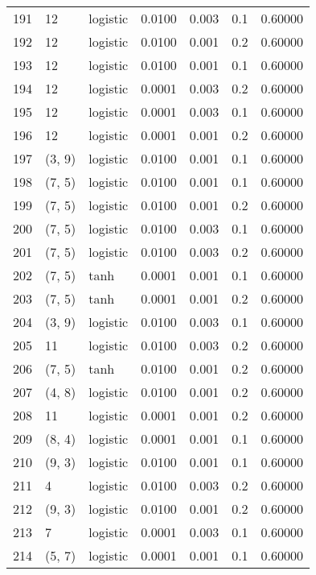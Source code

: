 \begin{tabular}{lllrrrr}
191 &          12 &  logistic &  0.0100 &  0.003 &  0.1 &   0.60000 \\
192 &          12 &  logistic &  0.0100 &  0.001 &  0.2 &   0.60000 \\
193 &          12 &  logistic &  0.0100 &  0.001 &  0.1 &   0.60000 \\
194 &          12 &  logistic &  0.0001 &  0.003 &  0.2 &   0.60000 \\
195 &          12 &  logistic &  0.0001 &  0.003 &  0.1 &   0.60000 \\
196 &          12 &  logistic &  0.0001 &  0.001 &  0.2 &   0.60000 \\
197 &      (3, 9) &  logistic &  0.0100 &  0.001 &  0.1 &   0.60000 \\
198 &      (7, 5) &  logistic &  0.0100 &  0.001 &  0.1 &   0.60000 \\
199 &      (7, 5) &  logistic &  0.0100 &  0.001 &  0.2 &   0.60000 \\
200 &      (7, 5) &  logistic &  0.0100 &  0.003 &  0.1 &   0.60000 \\
201 &      (7, 5) &  logistic &  0.0100 &  0.003 &  0.2 &   0.60000 \\
202 &      (7, 5) &      tanh &  0.0001 &  0.001 &  0.1 &   0.60000 \\
203 &      (7, 5) &      tanh &  0.0001 &  0.001 &  0.2 &   0.60000 \\
204 &      (3, 9) &  logistic &  0.0100 &  0.003 &  0.1 &   0.60000 \\
205 &          11 &  logistic &  0.0100 &  0.003 &  0.2 &   0.60000 \\
206 &      (7, 5) &      tanh &  0.0100 &  0.001 &  0.2 &   0.60000 \\
207 &      (4, 8) &  logistic &  0.0100 &  0.001 &  0.2 &   0.60000 \\
208 &          11 &  logistic &  0.0001 &  0.001 &  0.2 &   0.60000 \\
209 &      (8, 4) &  logistic &  0.0001 &  0.001 &  0.1 &   0.60000 \\
210 &      (9, 3) &  logistic &  0.0100 &  0.001 &  0.1 &   0.60000 \\
211 &           4 &  logistic &  0.0100 &  0.003 &  0.2 &   0.60000 \\
212 &      (9, 3) &  logistic &  0.0100 &  0.001 &  0.2 &   0.60000 \\
213 &           7 &  logistic &  0.0001 &  0.003 &  0.1 &   0.60000 \\
214 &      (5, 7) &  logistic &  0.0001 &  0.001 &  0.1 &   0.60000 \\

\end{tabular}
